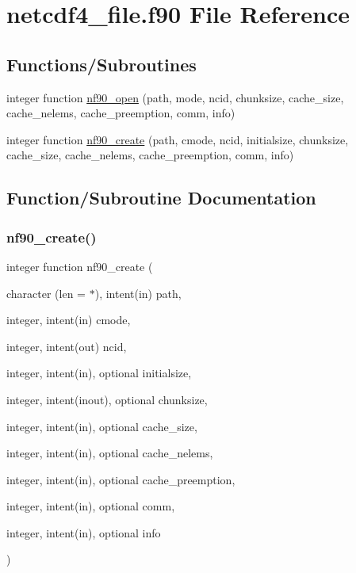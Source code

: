 \hypertarget{netcdf4__file_8f90}{}\section{netcdf4\+\_\+file.\+f90 File Reference}
\label{netcdf4__file_8f90}
\subsection*{Functions/\+Subroutines}
\begin{DoxyCompactItemize}
\item 
integer function \hyperlink{netcdf4__file_8f90_a67a79f214ac9e0f8f2080984f0dee6fe}{nf90\+\_\+open} (path, mode, ncid, chunksize, cache\+\_\+size, cache\+\_\+nelems, cache\+\_\+preemption, comm, info)
\item 
integer function \hyperlink{netcdf4__file_8f90_aec704cf84ffb94f046cb8093f6f2ee65}{nf90\+\_\+create} (path, cmode, ncid, initialsize, chunksize, cache\+\_\+size, cache\+\_\+nelems, cache\+\_\+preemption, comm, info)
\end{DoxyCompactItemize}


\subsection{Function/\+Subroutine Documentation}
\mbox{\label{netcdf4__file_8f90_aec704cf84ffb94f046cb8093f6f2ee65}} 
\subsubsection{\texorpdfstring{nf90\+\_\+create()}{nf90\_create()}}
{\footnotesize\ttfamily integer function nf90\+\_\+create (\begin{DoxyParamCaption}\item[{character (len = $\ast$), intent(in)}]{path,  }\item[{integer, intent(in)}]{cmode,  }\item[{integer, intent(out)}]{ncid,  }\item[{integer, intent(in), optional}]{initialsize,  }\item[{integer, intent(inout), optional}]{chunksize,  }\item[{integer, intent(in), optional}]{cache\+\_\+size,  }\item[{integer, intent(in), optional}]{cache\+\_\+nelems,  }\item[{integer, intent(in), optional}]{cache\+\_\+preemption,  }\item[{integer, intent(in), optional}]{comm,  }\item[{integer, intent(in), optional}]{info }\end{DoxyParamCaption})}



